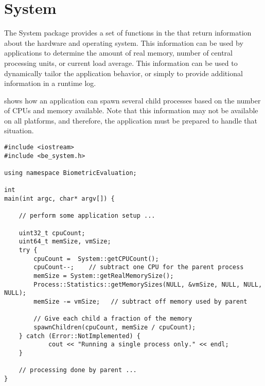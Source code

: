%
%
\chapter{System}
\label{chp-system}
The System package provides a set of functions in the that
return information about the hardware and operating system. This information
can be used by applications to determine the amount of real memory, number of
central processing units, or current load average. This information can be
used to dynamically tailor the application behavior, or simply to provide
additional information in a runtime log.

 shows how an application can spawn several child
processes based on the number of CPUs and memory available. Note that this
information may not be available on all platforms, and therefore, the
application must be prepared to handle that situation.

\lstset{language=c++}
\begin{lstlisting}[caption={Using the System CPU Count Information}, label=cpucountuse]
#include <iostream>
#include <be_system.h>

using namespace BiometricEvaluation;

int
main(int argc, char* argv[]) {

    // perform some application setup ...

    uint32_t cpuCount;
    uint64_t memSize, vmSize;
    try {
        cpuCount =  System::getCPUCount();
        cpuCount--;    // subtract one CPU for the parent process
        memSize = System::getRealMemorySize();
        Process::Statistics::getMemorySizes(NULL, &vmSize, NULL, NULL, NULL);
        memSize -= vmSize;   // subtract off memory used by parent

        // Give each child a fraction of the memory
        spawnChildren(cpuCount, memSize / cpuCount);
    } catch (Error::NotImplemented) {
            cout << "Running a single process only." << endl;
    }

    // processing done by parent ...
}

\end{lstlisting}
